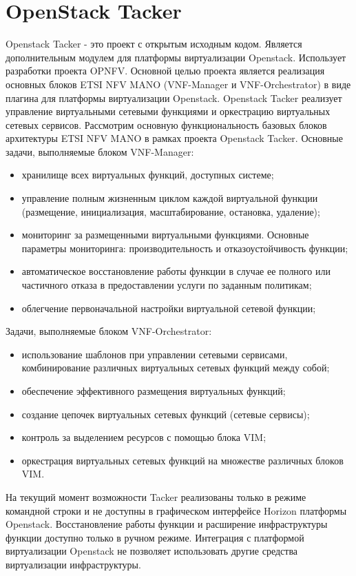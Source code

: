 \documentclass[oneside,final,14pt,a4paper]{extreport}
\begin{document}
\section{OpenStack Tacker}
Openstack Tacker - это проект с открытым исходным кодом. Является дополнительным модулем для платформы виртуализации Openstack. Использует разработки проекта OPNFV. Основной целью проекта является реализация основных блоков ETSI NFV MANO (VNF-Manager и VNF-Orchestrator) в виде плагина для платформы виртуализации Openstack. Openstack Tacker реализует управление виртуальными сетевыми функциями и оркестрацию виртуальных сетевых сервисов.
	Рассмотрим основную функциональность базовых блоков архитектуры ETSI NFV MANO в рамках проекта Openstack Tacker. Основные задачи, выполняемые блоком VNF-Manager:
\begin{itemize}
	\item хранилище всех виртуальных функций, доступных системе;
	\item управление полным жизненным циклом каждой виртуальной функции (размещение, инициализация, масштабирование, остановка, удаление);
	\item мониторинг за размещенными виртуальными функциями. Основные параметры мониторинга: производительность и отказоустойчивость функции;
	\item автоматическое восстановление работы функции в случае ее полного или частичного отказа в предоставлении услуги по заданным политикам;
	\item облегчение первоначальной настройки виртуальной сетевой функции;
\end{itemize}
Задачи, выполняемые блоком VNF-Orchestrator:
\begin{itemize}
	\item использование шаблонов при управлении сетевыми сервисами, комбинирование различных виртуальных сетевых функций между собой;
	\item обеспечение эффективного размещения виртуальных функций;
	\item создание цепочек виртуальных сетевых функций (сетевые сервисы);
	\item контроль за выделением ресурсов с помощью блока VIM;
	\item оркестрация виртуальных сетевых функций на множестве различных блоков VIM.
\end{itemize}

На текущий момент возможности Tacker реализованы только в режиме командной строки и не доступны в графическом интерфейсе Horizon платформы Openstack.\cite{tacker-official} 
Восстановление работы функции и расширение инфраструктуры функции доступно только в ручном режиме. Интеграция с платформой виртуализации Openstack не позволяет использовать другие средства виртуализации инфраструктуры.
\end{document}
